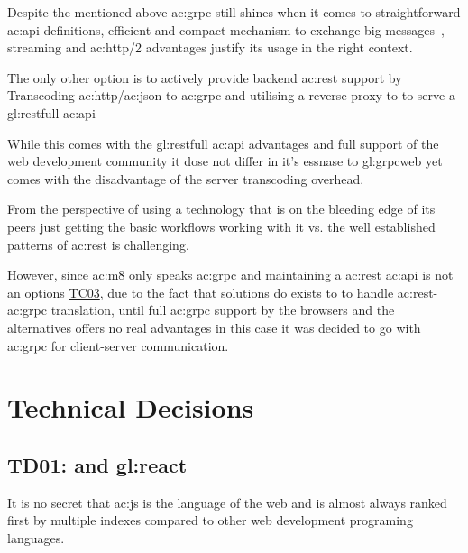 Despite the mentioned above \gls{ac:grpc} still shines when it comes to straightforward \gls{ac:api} definitions, efficient and compact mechanism to exchange big messages~\citep{richardson2018microservices}, streaming and \gls{ac:http}/2 advantages justify its usage in the right context. 


The only other option is to actively provide backend \gls{ac:rest} support by Transcoding \gls{ac:http}/\gls{ac:json} to \gls{ac:grpc} and utilising a reverse proxy to to serve a \gls{gl:restfull} \gls{ac:api}~\citep{grpcgateway}


While this comes with the \gls{gl:restfull} \gls{ac:api} advantages and full support of the web development community it dose not differ in it's essnase to \gls{gl:grpcweb} yet comes with the disadvantage of the server transcoding overhead.


From the perspective of using a technology that is on the bleeding edge of its peers just getting the basic workflows working with it vs. the well established patterns of \gls{ac:rest} is challenging.

However, since \gls{ac:m8} only speaks \gls{ac:grpc} and maintaining a \gls{ac:rest} \gls{ac:api} is not an options \hyperref[tab:actc]{TC03}, due to the fact that solutions do exists to to handle \gls{ac:rest}-\gls{ac:grpc} translation, until full \gls{ac:grpc} support by the browsers and the alternatives offers no real advantages in this case it was decided to go with \gls{ac:grpc} for client-server communication.

\section{Technical Decisions}

\subsection{TD01:  and \gls{gl:react}}\label{abtd:01}

It is no secret that \gls{ac:js} is the language of the web and is almost always ranked first by multiple indexes compared to other web development programing languages.

